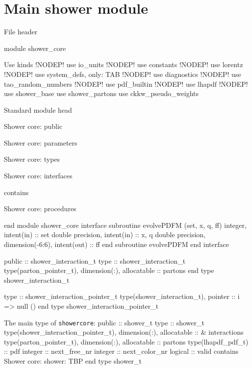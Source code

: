 \eatline
\nwendcode{}\nwdocspar
\section{Main shower module}
\nwenddocs{}\endmoddef
\LA{}File header\RA{}

module shower_core

\LA{}Use kinds\RA{} !NODEP!
  use io_units !NODEP!
  use constants !NODEP!
  use lorentz !NODEP!
  use system_defs, only: TAB !NODEP!
  use diagnostics !NODEP!
  use tao_random_numbers !NODEP!
  use pdf_builtin !NODEP!
  use lhapdf !NODEP!
  use shower_base
  use shower_partons
  use ckkw_pseudo_weights

\LA{}Standard module head\RA{}

\LA{}Shower core: public\RA{}

\LA{}Shower core: parameters\RA{}

\LA{}Shower core: types\RA{}

\LA{}Shower core: interfaces\RA{}

contains

\LA{}Shower core: procedures\RA{}

end module shower_core
\eatline
\nwendcode{}\nwdocspar
\nwenddocs{}\endmoddef
  interface
     subroutine evolvePDFM (set, x, q, ff)
       integer, intent(in) :: set
       double precision, intent(in) :: x, q
       double precision, dimension(-6:6), intent(out) :: ff
     end subroutine evolvePDFM
  end interface

\eatline
\nwendcode{}\nwdocspar
\nwenddocs{}\endmoddef
  public :: shower_interaction_t
\nwendcode{}\endmoddef
  type :: shower_interaction_t
     type(parton_pointer_t), dimension(:), allocatable :: partons
  end type shower_interaction_t

  type :: shower_interaction_pointer_t
     type(shower_interaction_t), pointer :: i => null ()
  end type shower_interaction_pointer_t

\eatline
\eatline
\nwendcode{}The main type of {\tt{}shower{}core}:
\nwenddocs{}\plusendmoddef
  public :: shower_t
\nwendcode{}\plusendmoddef
  type :: shower_t
     type(shower_interaction_pointer_t), dimension(:), allocatable :: &
          interactions
     type(parton_pointer_t), dimension(:), allocatable :: partons
     type(lhapdf_pdf_t) :: pdf
     integer :: next_free_nr
     integer :: next_color_nr
     logical :: valid
   contains
   \LA{}Shower core: shower: TBP\RA{}
  end type shower_t


